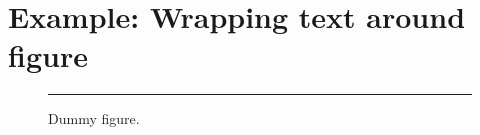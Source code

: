 \documentclass[11pt]{article}
\begin{document}
\section{Example: Wrapping text around figure}
\begin{wrapfigure}{r}{0.5\linewidth}
\centering
\rule{0.9\linewidth}{0.75\linewidth}
\caption{Dummy figure.}
\label{fig:myfig}
\end{wrapfigure}
\blindtext
\end{document}
